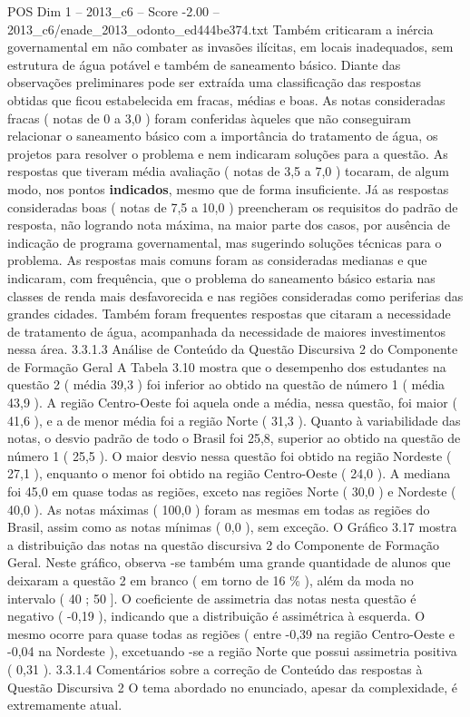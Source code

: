 \begin{textsample}{POS Dim 1 – 2013\_c6 – Score -2.00 – 2013\_c6/enade\_2013\_odonto\_ed444be374.txt}
Também criticaram a inércia governamental em não combater as invasões ilícitas, em locais inadequados, sem estrutura de água potável e também de saneamento básico.
Diante das observações preliminares pode ser extraída uma classificação das respostas obtidas que ficou estabelecida em fracas, médias e boas.
As notas consideradas fracas ( notas de 0 a 3,0 ) foram conferidas àqueles que não conseguiram relacionar o saneamento básico com a importância do tratamento de água, os projetos para resolver o problema e nem indicaram soluções para a questão.
As respostas que tiveram média avaliação ( notas de 3,5 a 7,0 ) tocaram, de algum modo, nos pontos \textbf{indicados}, mesmo que de forma insuficiente.
Já as respostas consideradas boas ( notas de 7,5 a 10,0 ) preencheram os requisitos do padrão de resposta, não logrando nota máxima, na maior parte dos casos, por ausência de indicação de programa governamental, mas sugerindo soluções técnicas para o problema.
As respostas mais comuns foram as consideradas medianas e que indicaram, com frequência, que o problema do saneamento básico estaria nas classes de renda mais desfavorecida e nas regiões consideradas como periferias das grandes cidades.
Também foram frequentes respostas que citaram a necessidade de tratamento de água, acompanhada da necessidade de maiores investimentos nessa área. 3.3.1.3 Análise de Conteúdo da Questão Discursiva 2 do Componente de Formação Geral A Tabela 3.10 mostra que o desempenho dos estudantes na questão 2 ( média 39,3 ) foi inferior ao obtido na questão de número 1 ( média 43,9 ).
A região Centro-Oeste foi aquela onde a média, nessa questão, foi maior ( 41,6 ), e a de menor média foi a região Norte ( 31,3 ).
Quanto à variabilidade das notas, o desvio padrão de todo o Brasil foi 25,8, superior ao obtido na questão de número 1 ( 25,5 ).
O maior desvio nessa questão foi obtido na região Nordeste ( 27,1 ), enquanto o menor foi obtido na região Centro-Oeste ( 24,0 ).
A mediana foi 45,0 em quase todas as regiões, exceto nas regiões Norte ( 30,0 ) e Nordeste ( 40,0 ).
As notas máximas ( 100,0 ) foram as mesmas em todas as regiões do Brasil, assim como as notas mínimas ( 0,0 ), sem exceção.
O Gráfico 3.17 mostra a distribuição das notas na questão discursiva 2 do Componente de Formação Geral.
Neste gráfico, observa -se também uma grande quantidade de alunos que deixaram a questão 2 em branco ( em torno de 16 \% ), além da moda no intervalo ( 40 ; 50 ].
O coeficiente de assimetria das notas nesta questão é negativo ( -0,19 ), indicando que a distribuição é assimétrica à esquerda.
O mesmo ocorre para quase todas as regiões ( entre -0,39 na região Centro-Oeste e -0,04 na Nordeste ), excetuando -se a região Norte que possui assimetria positiva ( 0,31 ). 3.3.1.4 Comentários sobre a correção de Conteúdo das respostas à Questão Discursiva 2 O tema abordado no enunciado, apesar da complexidade, é extremamente atual.

\end{textsample}
